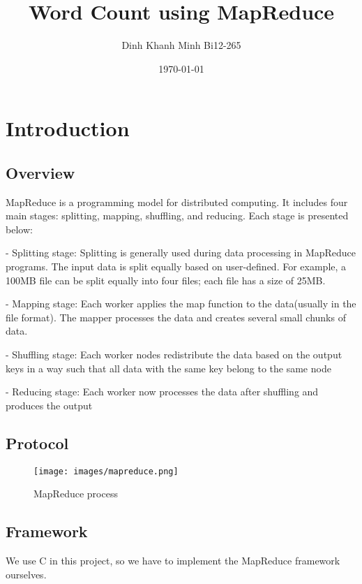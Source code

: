 \documentclass[]{article}
\begin{document}
\title{Word Count using MapReduce}
\author{Dinh Khanh Minh Bi12-265}
\date{\today}

\maketitle

\tableofcontents
\newpage

\section{Introduction}
\subsection{Overview}
\noindent%
MapReduce is a programming model for distributed computing. It includes four main stages: splitting, mapping, shuffling, and reducing. Each stage is presented below:

\noindent%
- Splitting stage: Splitting is generally used during data processing in MapReduce programs. The input data is split equally based on user-defined. For example, a 100MB file can be split equally into four files; each file has a size of 25MB.

\noindent%
- Mapping stage: Each worker applies the map function to the data(usually in the file format). The mapper processes the data and creates several small chunks of data.

\noindent%
- Shuffling stage: Each worker nodes redistribute the data based on the output keys in a way such that all data with the same key belong to the same node

\noindent%
- Reducing stage: Each worker now processes the data after shuffling and produces the output


\subsection{Protocol}
\begin{figure}[h]
    \centering
    \texttt{[image: images/mapreduce.png]}
    \caption{MapReduce process\cite{MPI word count}}
    \label{fig:protocol}
\end{figure}

\subsection{Framework}
\noindent%
We use C in this project, so we have to implement the MapReduce framework ourselves.
\end{document}
